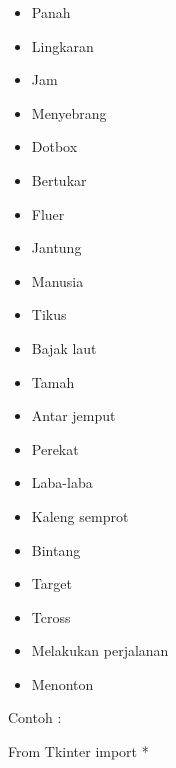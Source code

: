 \documentclass [12pt,a4paper,notitlepage,oneside,bahasa]{article}
\begin{document}
\begin{enumerate}
\begin{itemize}
\noindent 
\begin{itemize}
\item Panah \par
\noindent 
\item Lingkaran \par
\noindent 
\item Jam \par
\noindent 
\item Menyebrang \par
\noindent 
\item Dotbox \par
\noindent 
\item Bertukar \par
\noindent 
\item Fluer \par
\noindent 
\item Jantung \par
\noindent 
\item Manusia \par
\noindent 
\item Tikus \par
\noindent 
\item Bajak laut \par
\noindent 
\item Tamah \par
\noindent 
\item Antar jemput \par
\noindent 
\item Perekat \par
\noindent 
\item Laba-laba \par
\noindent 
\item Kaleng semprot \par
\noindent 
\item Bintang \par
\noindent 
\item Target \par
\noindent 
\item Tcross \par
\noindent 
\item Melakukan perjalanan \par
\noindent 
\item Menonton\end{itemize}
 \par
\vspace{12pt}
Contoh : \par
{\fontsize{10pt}{10pt}\selectfont From Tkinter import *} \par

\end{itemize}
\end{enumerate}
\end{document}
